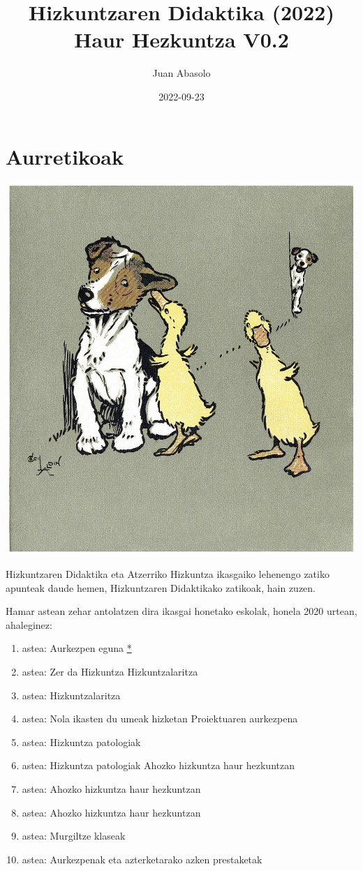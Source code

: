 \documentclass[
]{book}
\title{Hizkuntzaren Didaktika (2022) Haur Hezkuntza V0.2}
\author{Juan Abasolo}
\date{2022-09-23}
\providecommand{\tightlist}{%
  \setlength{\itemsep}{0pt}\setlength{\parskip}{0pt}}
\begin{document}
\maketitle

{
\setcounter{tocdepth}{1}
\tableofcontents
}
\hypertarget{Aurretikoak}{%
\chapter*{Aurretikoak}\label{Aurretikoak}}

\includegraphics{assets/scare-quacks-1200.jpg}

Hizkuntzaren Didaktika eta Atzerriko Hizkuntza ikasgaiko lehenengo zatiko apunteak daude hemen, Hizkuntzaren Didaktikako zatikoak, hain zuzen.

Hamar astean zehar antolatzen dira ikasgai honetako eskolak, honela 2020 urtean, ahaleginez:

\begin{enumerate}
\def\labelenumi{\arabic{enumi}.}
\tightlist
\item
  astea: Aurkezpen eguna \href{../diapoak/}{*}
\item
  astea: Zer da Hizkuntza \textbar{} Hizkuntzalaritza
\item
  astea: Hizkuntzalaritza
\item
  astea: Nola ikasten du umeak hizketan \textbar{} Proiektuaren aurkezpena
\item
  astea: Hizkuntza patologiak
\item
  astea: Hizkuntza patologiak \textbar{} Ahozko hizkuntza haur hezkuntzan
\item
  astea: Ahozko hizkuntza haur hezkuntzan
\item
  astea: Ahozko hizkuntza haur hezkuntzan
\item
  astea: Murgiltze klaseak
\item
  astea: Aurkezpenak eta azterketarako azken prestaketak
\end{enumerate}
\end{document}

